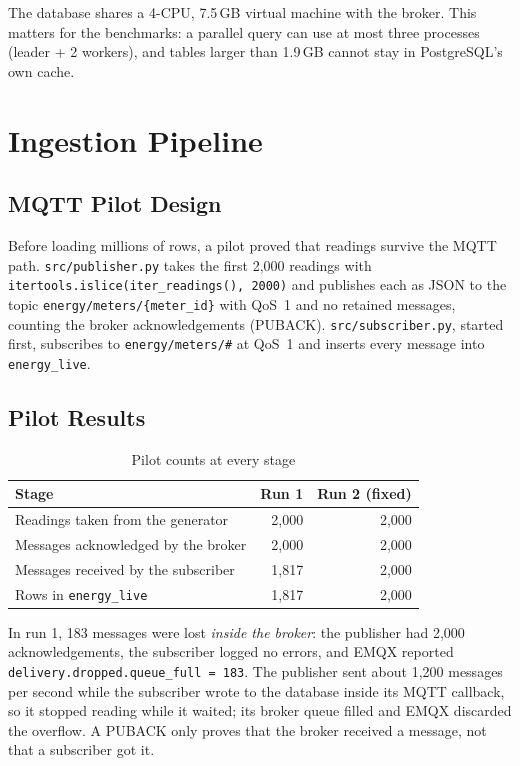 \documentclass[11pt,a4paper]{article}
\begin{document}
The database shares a 4-CPU, 7.5\,GB virtual machine with the broker. This matters for the benchmarks: a parallel query can use at most three processes (leader + 2 workers), and tables larger than 1.9\,GB cannot stay in PostgreSQL's own cache.

\section{Ingestion Pipeline}

\subsection{MQTT Pilot Design}

Before loading millions of rows, a pilot proved that readings survive the MQTT path. \texttt{src/publisher.py} takes the first 2,000 readings with \texttt{itertools.islice(iter\_readings(), 2000)} and publishes each as JSON to the topic \texttt{energy/meters/\{meter\_id\}} with QoS~1 and no retained messages, counting the broker acknowledgements (PUBACK). \texttt{src/subscriber.py}, started first, subscribes to \texttt{energy/meters/\#} at QoS~1 and inserts every message into \texttt{energy\_live}.

\subsection{Pilot Results}

\begin{table}[H]
\centering
\begin{tabular}{lrr}
\toprule
\textbf{Stage} & \textbf{Run 1} & \textbf{Run 2 (fixed)} \\
\midrule
Readings taken from the generator & 2,000 & 2,000 \\
Messages acknowledged by the broker & 2,000 & 2,000 \\
Messages received by the subscriber & 1,817 & 2,000 \\
Rows in \texttt{energy\_live} & 1,817 & 2,000 \\
\bottomrule
\end{tabular}
\caption{Pilot counts at every stage}
\end{table}

In run 1, 183 messages were lost \emph{inside the broker}: the publisher had 2,000 acknowledgements, the subscriber logged no errors, and EMQX reported \texttt{delivery.dropped.queue\_full = 183}. The publisher sent about 1,200 messages per second while the subscriber wrote to the database inside its MQTT callback, so it stopped reading while it waited; its broker queue filled and EMQX discarded the overflow. A PUBACK only proves that the broker received a message, not that a subscriber got it.
\end{document}
